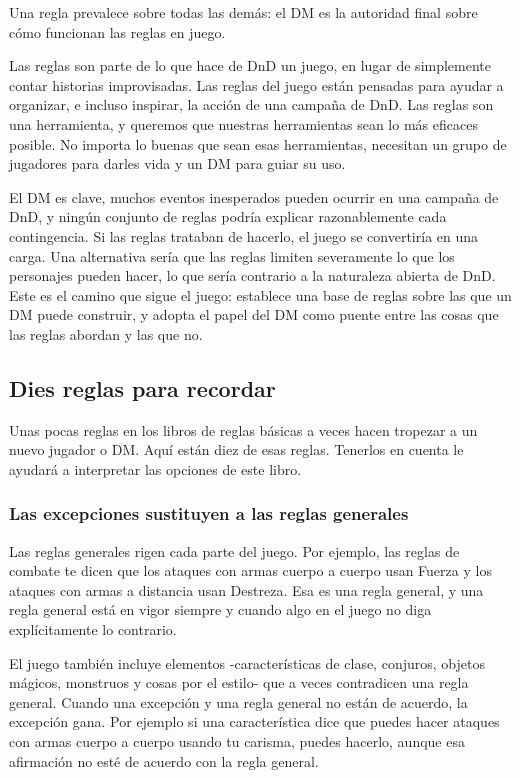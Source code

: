 \documentclass[a4paper,twocolumn,openany,10pt]{dndbook}
\begin{document}
Una regla prevalece sobre todas las demás: el DM es la autoridad final sobre cómo funcionan las reglas en juego.

Las reglas son parte de lo que hace de DnD un juego, en lugar de simplemente contar historias improvisadas. Las reglas del juego
están pensadas para ayudar a organizar, e incluso inspirar, la acción de una campaña de DnD. Las reglas son una herramienta, y
queremos que nuestras herramientas sean lo más eficaces posible. No importa lo buenas que sean esas herramientas, necesitan un
grupo de jugadores para darles vida y un DM para guiar su uso.

El DM es clave, muchos eventos inesperados pueden ocurrir en una campaña de DnD, y ningún conjunto de reglas podría explicar
razonablemente cada contingencia. Si las reglas trataban de hacerlo, el juego se convertiría en una carga. Una alternativa sería
que las reglas limiten severamente lo que los personajes pueden hacer, lo que sería contrario a la naturaleza abierta de DnD.
Este es el camino que sigue el juego: establece una base de reglas sobre las que un DM puede construir, y adopta el papel del DM
como puente entre las cosas que las reglas abordan y las que no.

\subsection{Dies reglas para recordar}
Unas pocas reglas en los libros de reglas básicas a veces hacen tropezar a un nuevo jugador o DM. Aquí están diez de esas reglas.
Tenerlos en cuenta le ayudará a interpretar las opciones de este libro.  

\subsubsection{Las excepciones sustituyen a las reglas generales}
Las reglas generales rigen cada parte del juego. Por ejemplo, las reglas de combate te dicen que los ataques con armas cuerpo a
cuerpo usan Fuerza y los ataques con armas a distancia usan Destreza. Esa es una regla general, y una regla general está en vigor
siempre y cuando algo en el juego no diga explícitamente lo contrario.

El juego también incluye elementos -características de clase, conjuros, objetos mágicos, monstruos y cosas por el estilo- que a
veces contradicen una regla general. Cuando una excepción y una regla general no están de acuerdo, la excepción gana. Por ejemplo
si una característica dice que puedes hacer ataques con armas cuerpo a cuerpo usando tu carisma, puedes hacerlo, aunque esa
afirmación no esté de acuerdo con la regla general.
\end{document}
